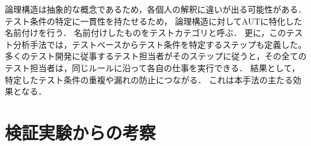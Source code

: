 \documentclass[a4paper,12pt]{jreport}
\begin{document}
論理構造は抽象的な概念であるため，各個人の解釈に違いが出る可能性がある．テスト条件の特定に一貫性を持たせるため， 論理構造に対してAUTに特化した名前付けを行う．
名前付けしたものをテストカテゴリと呼ぶ．
更に，このテスト分析手法では，テストベースからテスト条件を特定するステップも定義した。
多くのテスト開発に従事するテスト担当者がそのステップに従うと，その全てのテスト担当者は，同じルールに沿って各自の仕事を実行できる．
結果として，特定したテスト条件の重複や漏れの防止につながる．
これは本手法の主たる効果となる．

\section{検証実験からの考察}
\end{document}

